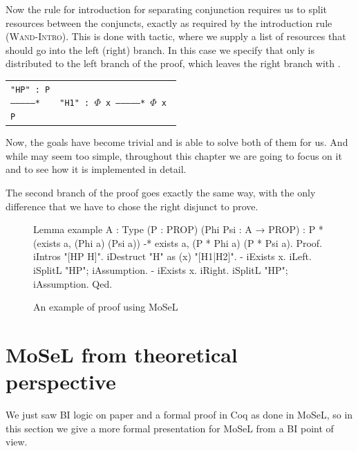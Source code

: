 Now the rule for introduction for separating conjunction requires us to split resources between the conjuncts, exactly as required by the introduction rule (\textsc{Wand-Intro}).
This is done with  tactic, where we supply a list of resources that should go into the left (right) branch.
In this case we specify that only  is distributed to the left branch of the proof, which leaves the right branch with .

\begin{minipage}[t]{\linewidth}
\begin{tabular}{l l}
  \parbox[t]{0.5\textwidth}{\texttt{"HP" : P\\
  ---------------*\\
  P}} &
  \parbox[t]{0.5\textwidth}{\texttt{"H1" : $\Phi$ x\\
  ---------------*\\
  $\Phi$ x }}
\end{tabular}
\end{minipage}


Now, the goals have become trivial and  is able to solve both of them for us.
And while  may seem too simple, throughout this chapter we are going to focus on it and to see how it is implemented in detail.

The second branch of the proof goes exactly the same way, with the only difference that we have to chose the right disjunct to prove.

\begin{figure}
\begin{coq}
Lemma example {A : Type} (P : PROP) (Phi Psi : A → PROP) :
  P * (exists a, (Phi a) \/ (Psi a)) -* exists a, (P * Phi a) \/ (P * Psi a).
Proof.
  iIntros "[HP H]".
  iDestruct "H" as (x) "[H1|H2]".
  - iExists x. iLeft. iSplitL "HP"; iAssumption.
  - iExists x. iRight. iSplitL "HP"; iAssumption.
Qed.
\end{coq}
  \caption{An example of proof using MoSeL}
  \label{fig:mosel-example-full}
\end{figure}

\section{MoSeL from theoretical perspective}
\label{sec:ipm_theory}

We just saw BI logic on paper and a formal proof in Coq as done in MoSeL, so in this section we give a more formal presentation for MoSeL from a BI point of view.

